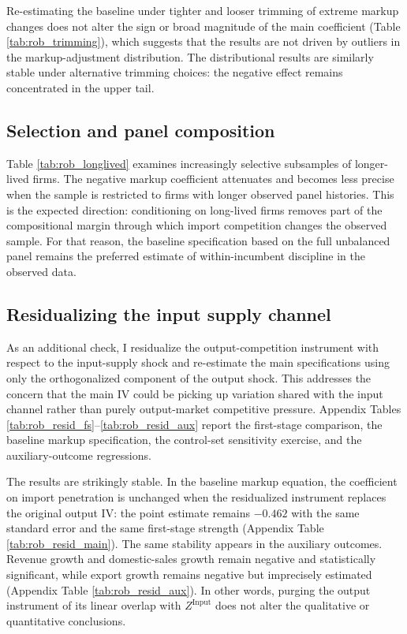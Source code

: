 \documentclass[12pt]{article}
\begin{document}
Re-estimating the baseline under tighter and looser trimming of extreme markup changes does not alter the sign or broad magnitude of the main coefficient (Table \ref{tab:rob_trimming}), which suggests that the results are not driven by outliers in the markup-adjustment distribution. The distributional results are similarly stable under alternative trimming choices: the negative effect remains concentrated in the upper tail.

\subsection{Selection and panel composition}
Table \ref{tab:rob_longlived} examines increasingly selective subsamples of longer-lived firms. The negative markup coefficient attenuates and becomes less precise when the sample is restricted to firms with longer observed panel histories. This is the expected direction: conditioning on long-lived firms removes part of the compositional margin through which import competition changes the observed sample. For that reason, the baseline specification based on the full unbalanced panel remains the preferred estimate of within-incumbent discipline in the observed data.

\subsection{Residualizing the input supply channel}
As an additional check, I residualize the output-competition instrument with respect to the input-supply shock and re-estimate the main specifications using only the orthogonalized component of the output shock. This addresses the concern that the main IV could be picking up variation shared with the input channel rather than purely output-market competitive pressure. Appendix Tables \ref{tab:rob_resid_fs}--\ref{tab:rob_resid_aux} report the first-stage comparison, the baseline markup specification, the control-set sensitivity exercise, and the auxiliary-outcome regressions.

The results are strikingly stable. In the baseline markup equation, the coefficient on import penetration is unchanged when the residualized instrument replaces the original output IV: the point estimate remains $-0.462$ with the same standard error and the same first-stage strength (Appendix Table \ref{tab:rob_resid_main}). The same stability appears in the auxiliary outcomes. Revenue growth and domestic-sales growth remain negative and statistically significant, while export growth remains negative but imprecisely estimated (Appendix Table \ref{tab:rob_resid_aux}). In other words, purging the output instrument of its linear overlap with $Z^{\text{Input}}$ does not alter the qualitative or quantitative conclusions.
\end{document}
